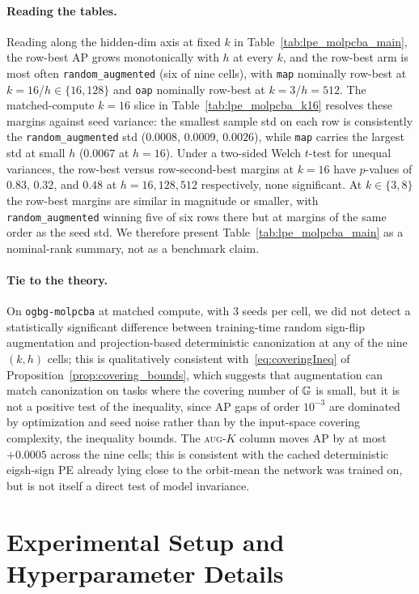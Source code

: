 \documentclass{article}
\begin{document}
\paragraph{Reading the tables.}
Reading along the hidden-dim axis at fixed $k$ in
Table~\ref{tab:lpe_molpcba_main}, the row-best AP grows monotonically
with $h$ at every $k$, and the row-best arm is most often
\texttt{random\_augmented} (six of nine cells), with \texttt{map}
nominally row-best at $k\!=\!16$/$h\!\in\!\{16,128\}$ and \texttt{oap}
nominally row-best at $k\!=\!3$/$h\!=\!512$. The matched-compute
$k\!=\!16$ slice in Table~\ref{tab:lpe_molpcba_k16} resolves these
margins against seed variance: the smallest sample std on each row
is consistently the \texttt{random\_augmented} std ($0.0008$,
$0.0009$, $0.0026$), while \texttt{map} carries the largest std at
small $h$ ($0.0067$ at $h\!=\!16$). Under a two-sided Welch
$t$-test for unequal variances, the row-best versus row-second-best
margins at $k\!=\!16$ have $p$-values of $0.83$, $0.32$, and $0.48$
at $h\!=\!16,128,512$ respectively, none significant. At $k\!\in\!\{3,8\}$
the row-best margins are similar in magnitude or smaller, with
\texttt{random\_augmented} winning five of six rows there but at
margins of the same order as the seed std. We therefore present
Table~\ref{tab:lpe_molpcba_main} as a nominal-rank summary, not as
a benchmark claim.

\paragraph{Tie to the theory.}
On \texttt{ogbg-molpcba} at matched compute, with $3$ seeds per cell,
we did not detect a statistically significant difference between
training-time random sign-flip augmentation and projection-based
deterministic canonization at any of the nine $(k,h)$ cells; this is
qualitatively consistent with~\eqref{eq:coveringIneq} of
Proposition~\ref{prop:covering_bounds}, which suggests that augmentation can match
canonization on tasks where the covering number of $\mathbb{G}$ is small,
but it is not a positive test of the inequality, since AP gaps of
order $10^{-3}$ are dominated by optimization and seed noise rather
than by the input-space covering complexity, the inequality bounds.
The \textsc{aug-$K$} column moves AP by at most $+0.0005$ across the
nine cells; this is consistent with the cached deterministic
eigsh-sign PE already lying close to the orbit-mean the network was
trained on, but is not itself a direct test of model invariance.

\section{Experimental Setup and Hyperparameter Details}
\label{app:exp_setup}
\end{document}

